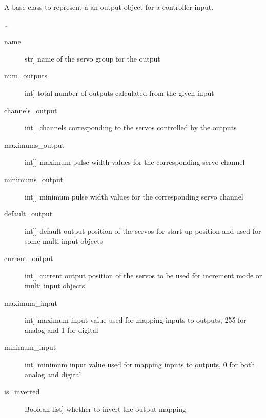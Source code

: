 \documentclass[letterpaper,10pt,english]{sphinxmanual}
\begin{document}
\begin{fulllineitems}
\label{\detokenize{base:OutputObject.OutputObject}}
\sphinxAtStartPar
A base class to represent a an output object for a controller input.

\sphinxAtStartPar
…
\begin{description}
\item[{name}] \leavevmode{[}str{]}
\sphinxAtStartPar
name of the servo group for the output

\item[{num\_outputs}] \leavevmode{[}int{]}
\sphinxAtStartPar
total number of outputs calculated from the given input

\item[{channels\_output}] \leavevmode{[}{[}int{]}{]}
\sphinxAtStartPar
channels corresponding to the servos controlled by the outputs

\item[{maximums\_output}] \leavevmode{[}{[}int{]}{]}
\sphinxAtStartPar
maximum pulse width values for the corresponding servo channel

\item[{minimums\_output}] \leavevmode{[}{[}int{]}{]}
\sphinxAtStartPar
minimum pulse width values for the corresponding servo channel

\item[{default\_output}] \leavevmode{[}{[}int{]}{]}
\sphinxAtStartPar
default output position of the servos for start up position and used for some multi input objects

\item[{current\_output}] \leavevmode{[}{[}int{]}{]}
\sphinxAtStartPar
current output position of the servos to be used for increment mode or multi input objects

\item[{maximum\_input}] \leavevmode{[}int{]}
\sphinxAtStartPar
maximum input value used for mapping inputs to outputs, 255 for analog and 1 for digital

\item[{minimum\_input}] \leavevmode{[}int{]}
\sphinxAtStartPar
minimum input value used for mapping inputs to outputs, 0 for both analog and digital

\item[{is\_inverted}] \leavevmode{[}Boolean list{]}
\sphinxAtStartPar
whether to invert the output mapping


\end{description}
\end{fulllineitems}
\end{document}
